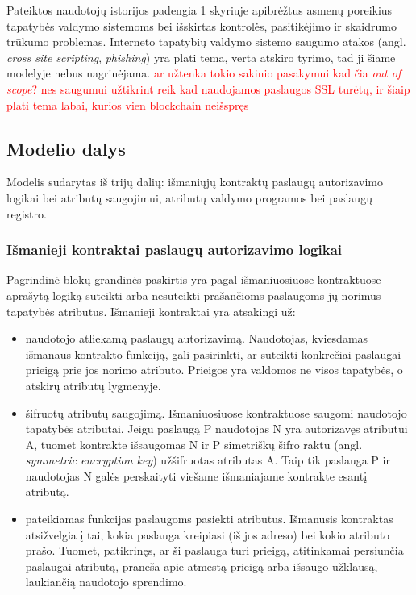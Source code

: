 Pateiktos naudotojų istorijos padengia 1 skyriuje apibrėžtus asmenų poreikius tapatybės valdymo
sistemoms bei išskirtas kontrolės, pasitikėjimo ir skaidrumo trūkumo problemas. Interneto tapatybių valdymo sistemo saugumo atakos (angl.
\textit{cross site scripting}, \textit{phishing}) yra plati tema, verta atskiro tyrimo, tad ji šiame modelyje nebus nagrinėjama. \textcolor{red}{ar užtenka tokio sakinio pasakymui kad čia \textit{out of scope}? nes saugumui užtikrint reik
kad naudojamos paslaugos SSL turėtų, ir šiaip plati tema labai, kurios vien blockchain neišspręs}

\subsection{Modelio dalys}

Modelis sudarytas iš trijų dalių: išmaniųjų kontraktų paslaugų autorizavimo logikai bei atributų saugojimui,
atributų valdymo programos bei paslaugų registro.

\subsubsection{Išmanieji kontraktai paslaugų autorizavimo logikai} \label{BCIDM:blockchainFunctions}

Pagrindinė blokų grandinės paskirtis yra pagal išmaniuosiuose kontraktuose aprašytą logiką suteikti arba nesuteikti
prašančioms paslaugoms jų norimus tapatybės atributus. Išmanieji kontraktai yra atsakingi už:

\begin{itemize}
    \item naudotojo atliekamą paslaugų autorizavimą. Naudotojas, kviesdamas išmanaus kontrakto funkciją, gali pasirinkti,
    ar suteikti konkrečiai paslaugai prieigą prie jos norimo atributo. Prieigos yra valdomos ne visos tapatybės, o
    atskirų atributų lygmenyje.

    \item šifruotų atributų saugojimą. Išmaniuosiuose kontraktuose saugomi naudotojo tapatybės atributai. Jeigu paslaugą P
    naudotojas N yra autorizavęs atributui A, tuomet kontrakte išsaugomas N ir P simetriškų šifro raktu (angl.
    \textit{symmetric encryption key}) užšifruotas atributas A. Taip tik paslauga P
    ir naudotojas N galės perskaityti viešame išmaniajame kontrakte esantį atributą.

    \item pateikiamas funkcijas paslaugoms pasiekti atributus. Išmanusis kontraktas atsižvelgia į tai, kokia paslauga kreipiasi (iš
    jos adreso) bei kokio atributo prašo. Tuomet, patikrinęs, ar ši paslauga turi prieigą, atitinkamai persiunčia
    paslaugai atributą, praneša apie atmestą prieigą arba išsaugo užklausą, laukiančią naudotojo sprendimo.
\end{itemize}

